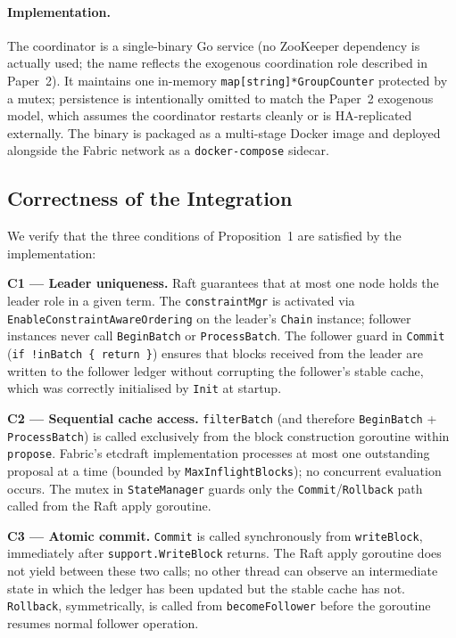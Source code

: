 \paragraph{Implementation.}
The coordinator is a single-binary Go service (no ZooKeeper dependency
is actually used; the name reflects the exogenous coordination role
described in Paper~2).  It maintains one in-memory \texttt{map[string]*GroupCounter}
protected by a mutex; persistence is intentionally omitted to match
the Paper~2 exogenous model, which assumes the coordinator restarts
cleanly or is HA-replicated externally.  The binary is packaged as a
multi-stage Docker image and deployed alongside the Fabric network
as a \texttt{docker-compose} sidecar.

\subsection{Correctness of the Integration}
\label{subsec:impl-correctness}

We verify that the three conditions of Proposition~1 are satisfied by the
implementation:

\textbf{C1 — Leader uniqueness.}
Raft guarantees that at most one node holds the leader role in a given term.
The \texttt{constraintMgr} is activated via \texttt{EnableConstraintAwareOrdering}
on the leader's \texttt{Chain} instance; follower instances never call
\texttt{BeginBatch} or \texttt{ProcessBatch}.  The follower guard in
\texttt{Commit} (\texttt{if !inBatch \{ return \}}) ensures that blocks
received from the leader are written to the follower ledger without corrupting
the follower's stable cache, which was correctly initialised by \texttt{Init}
at startup.

\textbf{C2 — Sequential cache access.}
\texttt{filterBatch} (and therefore \texttt{BeginBatch} + \texttt{ProcessBatch})
is called exclusively from the block construction goroutine within
\texttt{propose}.  Fabric's etcdraft implementation processes at most one
outstanding proposal at a time (bounded by \texttt{MaxInflightBlocks});
no concurrent evaluation occurs.  The mutex in \texttt{StateManager} guards
only the \texttt{Commit}/\texttt{Rollback} path called from the Raft apply
goroutine.

\textbf{C3 — Atomic commit.}
\texttt{Commit} is called synchronously from \texttt{writeBlock}, immediately
after \texttt{support.WriteBlock} returns.  The Raft apply goroutine does not
yield between these two calls; no other thread can observe an intermediate
state in which the ledger has been updated but the stable cache has not.
\texttt{Rollback}, symmetrically, is called from \texttt{becomeFollower} before
the goroutine resumes normal follower operation.


